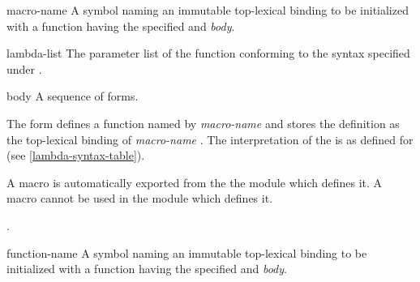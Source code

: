 \begin{optDefinition}
%
\Syntax
{}%
%
\begin{arguments}
    \item[macro-name] A symbol naming an immutable top-lexical binding to be
    initialized with a function having the specified  and {\em
        body}.

    \item[lambda-list] The parameter list of the function conforming to the
    syntax specified under .

    \item[body] A sequence of forms.
\end{arguments}
%
\remarks%
The  form defines a function  named by
{\em macro-name} and stores the definition as the top-lexical binding of {\em
    macro-name} 
.  The interpretation of the  is
as defined for  (see \ref{lambda-syntax-table}).
%
\begin{note}
    A macro is automatically exported from the the module which defines it.  A
    macro cannot be used in the module which defines it.
\end{note}
%
\seealso%
.

%
\Syntax
{}%
%
\begin{arguments}
    \item[function-name] A symbol naming an immutable top-lexical binding to be
    initialized with a function having the specified  and {\em
        body}.


\end{arguments}
\end{optDefinition}
